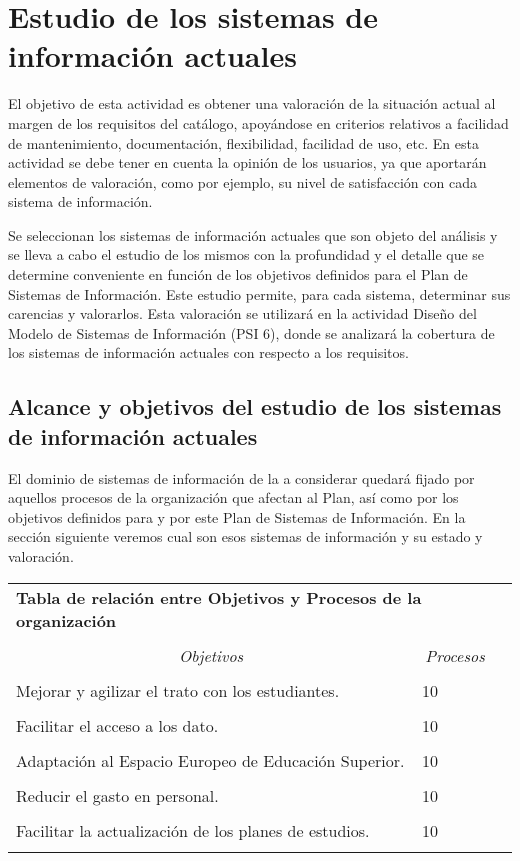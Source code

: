 \documentclass[11pt,a4paper,spanish,twoside]{book}
\begin{document}
\chapter{Estudio de los sistemas de información actuales}
El objetivo de esta actividad es obtener una valoración de la situación
actual al margen de los requisitos del catálogo, apoyándose en criterios
relativos a facilidad de mantenimiento, documentación, flexibilidad,
facilidad de uso, etc. En esta actividad se debe tener en cuenta la opinión
de los usuarios, ya que aportarán elementos de valoración, como por ejemplo,
su nivel de satisfacción con cada sistema de información. 

Se seleccionan los
sistemas de información actuales que son objeto del análisis y se lleva a
cabo el estudio de los mismos con la profundidad y el detalle que se
determine conveniente en función de los objetivos definidos para el Plan de
Sistemas de Información. Este estudio permite, para cada sistema, determinar
sus carencias y valorarlos. Esta valoración se utilizará en la actividad
Diseño del Modelo de Sistemas de Información (PSI 6), donde se analizará la
cobertura de los sistemas de información actuales con respecto a los
requisitos.

\section{Alcance y objetivos del estudio de los sistemas de 
  información actuales} 
El dominio de sistemas de información de la a considerar quedará fijado por
aquellos procesos de la organización que afectan al Plan, así como por los 
objetivos definidos para y por este Plan de Sistemas de Información. En la 
sección siguiente veremos cual son esos sistemas de información y su estado y 
valoración.

\begin{table}[!ht]
  \centering
  \begin{tabular}{lp{5cm}c}
    \multicolumn{2}{l}{\Large \textbf{Tabla de relación entre Objetivos y Procesos de la organización} } \\ \\
    \multicolumn{1}{c}{\emph{Objetivos}} & 
    \multicolumn{1}{c}{\emph{Procesos}} \\
    \hline \\
    Mejorar y agilizar el trato con los estudiantes.         & 10 \\ \\
    Facilitar el acceso a los dato.         & 10 \\ \\
    Adaptación al Espacio Europeo de Educación Superior.         & 10 \\ \\
    Reducir el gasto en personal.         & 10 \\ \\
    Facilitar la actualización de los planes de estudios.         & 10 \\ \\
    \hline
  \end{tabular}
\end{table}
\end{document}
